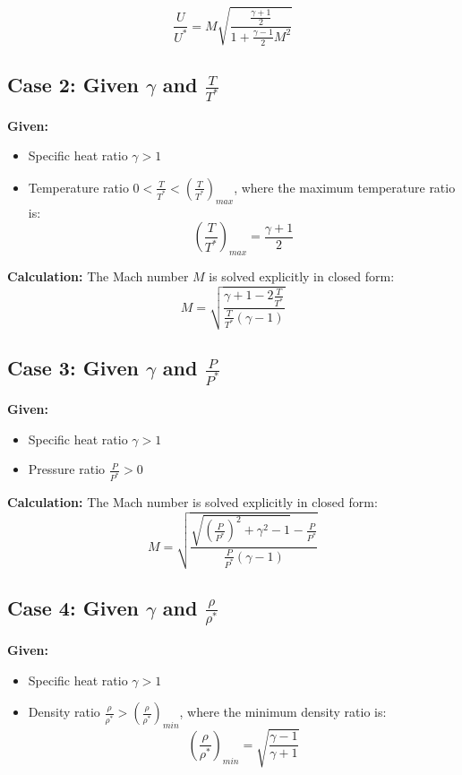 \begin{equation}
\frac{U}{U^*} = M\sqrt{\frac{\frac{\gamma+1}{2}}{1+\frac{\gamma-1}{2}M^2}}
\end{equation}


\subsection*{Case 2: Given $\gamma$ and $\frac{T}{T^*}$}

\textbf{Given:}
\begin{itemize}[nosep]
    \item Specific heat ratio $\gamma > 1$
    \item Temperature ratio $0 < \frac{T}{T^*} < \left(\frac{T}{T^*}\right)_{max}$, where the maximum temperature ratio is:
    \begin{equation}
    \left(\frac{T}{T^*}\right)_{max} = \frac{\gamma+1}{2}
    \end{equation}
\end{itemize}

\textbf{Calculation:} The Mach number $M$ is solved explicitly in closed form:
\begin{equation}
M = \sqrt{\frac{\gamma+1-2\frac{T}{T^*}}{\frac{T}{T^*}(\gamma-1)}}
\end{equation}


\subsection*{Case 3: Given $\gamma$ and $\frac{P}{P^*}$}

\textbf{Given:}
\begin{itemize}[nosep]
    \item Specific heat ratio $\gamma > 1$
    \item Pressure ratio $\frac{P}{P^*} > 0$
\end{itemize}

\textbf{Calculation:} The Mach number is solved explicitly in closed form:
\begin{equation}
M = \sqrt{\frac{\sqrt{\left(\frac{P}{P^*}\right)^2+\gamma^2-1}-\frac{P}{P^*}}{\frac{P}{P^*}(\gamma-1)}}
\end{equation}


\subsection*{Case 4: Given $\gamma$ and $\frac{\rho}{\rho^*}$}

\textbf{Given:}
\begin{itemize}[nosep]
    \item Specific heat ratio $\gamma > 1$
    \item Density ratio $\frac{\rho}{\rho^*} > \left(\frac{\rho}{\rho^*}\right)_{min}$, where the minimum density ratio is:
    \begin{equation}
    \left(\frac{\rho}{\rho^*}\right)_{min} = \sqrt{\frac{\gamma-1}{\gamma+1}}
    \end{equation}
\end{itemize}

